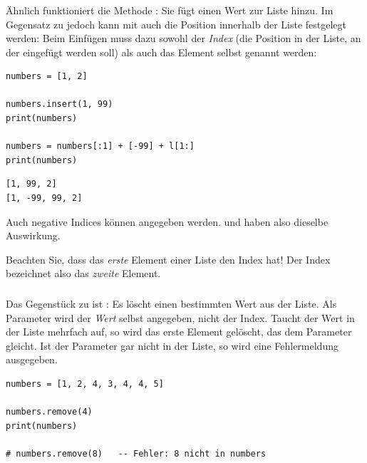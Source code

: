 \subsubsection{}
Ähnlich funktioniert die Methode : Sie fügt einen Wert zur Liste hinzu. Im Gegensatz zu  jedoch kann mit  auch die Position innerhalb der Liste festgelegt werden: Beim Einfügen muss dazu sowohl der \emph{Index} (die Position in der Liste, an der eingefügt werden soll) als auch das Element selbst genannt werden:

\begin{codebox}
\begin{verbatim}
numbers = [1, 2]

numbers.insert(1, 99)
print(numbers)

numbers = numbers[:1] + [-99] + l[1:]
print(numbers)
\end{verbatim}
\end{codebox}

\begin{cmdbox}[Ausgabe]
\begin{verbatim}
[1, 99, 2]
[1, -99, 99, 2]
\end{verbatim}
\end{cmdbox}

Auch negative Indices können angegeben werden.  und  haben also dieselbe Auswirkung.

\begin{warnbox}
Beachten Sie, dass das \emph{erste} Element einer Liste den Index  hat! Der Index  bezeichnet also das \emph{zweite} Element. 
\end{warnbox}

\subsubsection{}
Das Gegenstück zu  ist : Es löscht einen bestimmten Wert aus der Liste. Als Parameter wird der \emph{Wert} selbst angegeben, nicht der Index. Taucht der Wert in der Liste mehrfach auf, so wird das erste Element gelöscht, das dem Parameter gleicht. Ist der Parameter gar nicht in der Liste, so wird eine Fehlermeldung ausgegeben.

\begin{codebox}
\begin{verbatim}
numbers = [1, 2, 4, 3, 4, 4, 5]

numbers.remove(4)
print(numbers)

# numbers.remove(8)   -- Fehler: 8 nicht in numbers
\end{verbatim}
\end{codebox}

